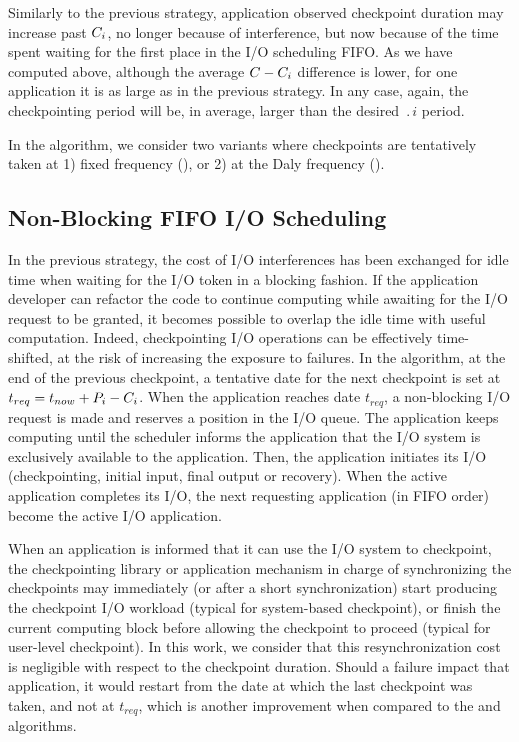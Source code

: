 Similarly to the previous strategy, application observed checkpoint
duration may increase past $C_{i}$, no longer because of interference, but now because
of  the time spent waiting for the first place in the I/O scheduling FIFO.
As we have computed above, although the average $C-C_{i}$
difference is lower, for one application it is as large as in the
previous strategy. In any case, again, the checkpointing period will
be, in average, larger than the desired $\period{i}$ period.

In the \fifoblock algorithm, we consider two variants where checkpoints are
tentatively taken at 1) fixed frequency (\bfifofixed), or 2) at the
Daly frequency (\bfifodaly).

\subsection{Non-Blocking \fifononblock FIFO I/O Scheduling}

In the previous strategy, the cost of I/O interferences has been
exchanged for idle time when waiting for the I/O token in a blocking
fashion. If the application developer can refactor the code
to continue computing while awaiting for the I/O request to be granted,
it becomes possible to overlap the idle time with useful computation.
Indeed, checkpointing I/O operations can
be effectively time-shifted, at the risk of increasing the exposure to failures.
 In the \fifononblock algorithm, at the end of the previous checkpoint, a tentative
date for the next checkpoint is set at $t_{req}=t_{now}+P_{i}-C_{i}$.
When the application reaches date $t_{req}$, a non-blocking I/O request
is made and reserves a position in the
I/O queue. The application keeps computing until the
scheduler informs the application that the I/O system is exclusively
available to the application. Then, the application initiates its
I/O (checkpointing, initial input, final output or recovery). When the active application completes
its I/O, the next requesting application (in FIFO order)
become the active I/O application.

When an application is informed that it can use the I/O system to
checkpoint, the checkpointing library or application mechanism
in charge of synchronizing the checkpoints may immediately (or after
a short synchronization) start producing the checkpoint I/O workload
(typical for system-based checkpoint),
or finish the current computing block before allowing the checkpoint
to proceed (typical for user-level checkpoint). In this work, we consider
that this resynchronization cost is negligible with respect to the
checkpoint duration. Should a failure impact that application,
it would restart from the date at which the last checkpoint was taken, and
not at $t_{req}$, which is another improvement when compared to the
\fifoblock and \nocoop algorithms.

